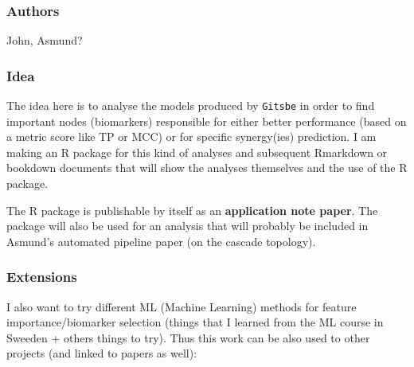 \documentclass[12pt,]{book}
\begin{document}
\hypertarget{authors}{%
\subsubsection*{Authors}\label{authors}}

John, Asmund?

\hypertarget{idea}{%
\subsubsection*{Idea}\label{idea}}

The idea here is to analyse the models produced by \texttt{Gitsbe} in order to find important nodes (biomarkers) responsible for either better performance (based on a metric score like TP or MCC) or for specific synergy(ies) prediction.
I am making an R package for this kind of analyses and subsequent Rmarkdown or bookdown documents that will show the analyses themselves and the use of the R package.

The R package is publishable by itself as an \textbf{application note paper}.
The package will also be used for an analysis that will probably be included in
Asmund's automated pipeline paper (on the cascade topology).

\hypertarget{extensions}{%
\subsubsection*{Extensions}\label{extensions}}

I also want to try different ML (Machine Learning) methods for feature importance/biomarker selection (things that I learned from the ML course in Sweeden + others things to try). Thus this work can be also used to other projects (and linked to papers as well):
\end{document}
